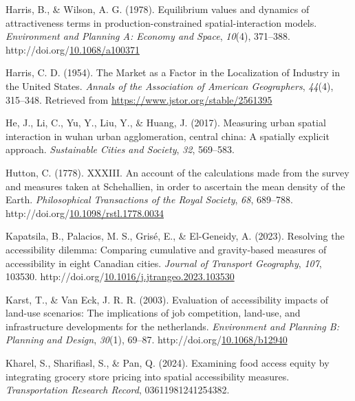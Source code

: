 \documentclass[
11pt, %
oneside, %
english, %
singlespacing, %
]{macthesis} %
\newlength{\cslhangindent}
\newenvironment{CSLReferences}[2] %
{\begin{list}{}{%
	\setlength{\itemindent}{0pt}
	\setlength{\leftmargin}{0pt}
	\setlength{\parsep}{0pt}
	\ifodd #1
	\setlength{\leftmargin}{\cslhangindent}
	\setlength{\itemindent}{-1\cslhangindent}
	\fi
	\setlength{\itemsep}{#2\baselineskip}}}
{\end{list}}
\begin{document}
\begin{CSLReferences}{1}{0}
Harris, B., \& Wilson, A. G. (1978). Equilibrium values and dynamics of attractiveness terms in production-constrained spatial-interaction models. \emph{Environment and Planning A: Economy and Space}, \emph{10}(4), 371--388. http://doi.org/\href{https://doi.org/10.1068/a100371}{10.1068/a100371}

Harris, C. D. (1954). The {Market} as a {Factor} in the {Localization} of {Industry} in the {United} {States}. \emph{Annals of the Association of American Geographers}, \emph{44}(4), 315--348. Retrieved from \url{https://www.jstor.org/stable/2561395}

He, J., Li, C., Yu, Y., Liu, Y., \& Huang, J. (2017). Measuring urban spatial interaction in wuhan urban agglomeration, central china: A spatially explicit approach. \emph{Sustainable Cities and Society}, \emph{32}, 569--583.

Hutton, C. (1778). {XXXIII}. {An} account of the calculations made from the survey and measures taken at {Schehallien}, in order to ascertain the mean density of the {Earth}. \emph{Philosophical Transactions of the Royal Society}, \emph{68}, 689--788. http://doi.org/\href{https://doi.org/10.1098/rstl.1778.0034}{10.1098/rstl.1778.0034}

Kapatsila, B., Palacios, M. S., Grisé, E., \& El-Geneidy, A. (2023). Resolving the accessibility dilemma: {Comparing} cumulative and gravity-based measures of accessibility in eight {Canadian} cities. \emph{Journal of Transport Geography}, \emph{107}, 103530. http://doi.org/\href{https://doi.org/10.1016/j.jtrangeo.2023.103530}{10.1016/j.jtrangeo.2023.103530}

Karst, T., \& Van Eck, J. R. R. (2003). Evaluation of accessibility impacts of land-use scenarios: The implications of job competition, land-use, and infrastructure developments for the netherlands. \emph{Environment and Planning B: Planning and Design}, \emph{30}(1), 69--87. http://doi.org/\href{https://doi.org/10.1068/b12940}{10.1068/b12940}

Kharel, S., Sharifiasl, S., \& Pan, Q. (2024). Examining food access equity by integrating grocery store pricing into spatial accessibility measures. \emph{Transportation Research Record}, 03611981241254382.


\end{CSLReferences}
\end{document}
